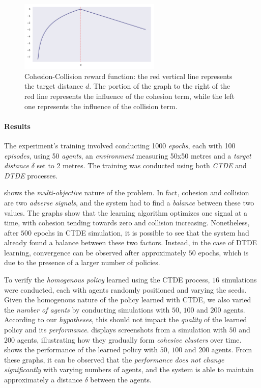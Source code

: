\documentclass[12pt,a4paper,openright,twoside]{book}
\begin{document}
    \begin{figure}[t]
        \centering
        \includegraphics[width=0.6\textwidth]{figures/ccreward.pdf}
        \caption{Cohesion-Collision reward function: the red vertical line represents the target distance $d$.
            The portion of the graph to the right of the red line represents the influence of the cohesion term,
            while the left one represents the influence of the collision term.
        }
        \label{fig:cc-rf}
    \end{figure}

\paragraph{Results}
The experiment's training involved conducting 1000 \emph{epochs}, each with 100 \emph{episodes}, using 50 \emph{agents}, an 
    \emph{environment} measuring 50x50 metres and a \emph{target distance} $\delta$ set to 2 metres. The training was conducted 
    using both \emph{CTDE} and \emph{DTDE} processes.

 shows the \emph{multi-objective} nature of the problem. In fact, cohesion and collision are two \emph{adverse signals},
    and the system had to find a \emph{balance} between these two values. The graphs show that the learning algorithm optimizes one signal 
    at a time, with cohesion tending towards zero and collision increasing. Nonetheless, after $500$ epochs in CTDE simulation, 
    it is possible to see that the system had already found a balance between these two factors. 
    Instead, in the case of DTDE learning, convergence can be observed after approximately $50$ epochs, 
    which is due to the presence of a larger number of policies.

To verify the \emph{homogenous policy} learned using the CTDE process, $16$ simulations were conducted, each with agents randomly 
    positioned and varying the seeds. Given the homogenous nature of the policy learned with CTDE, we also varied the \emph{number 
    of agents} by conducting simulations with $50$, $100$ and $200$ agents. According to our \emph{hypotheses}, 
    this should not impact the \emph{quality} of the learned policy and its \emph{performance}.
     displays screenshots from a simulation with $50$ and $200$ agents, illustrating how they gradually form \emph{cohesive clusters} 
    over time.  shows the performance of the learned policy with $50$, $100$ and $200$ agents. From these graphs, it can 
    be observed that the \emph{performance does not change significantly} with varying numbers of agents, and the system is able to 
    maintain approximately a distance $\delta$ between the agents.
\end{document}
